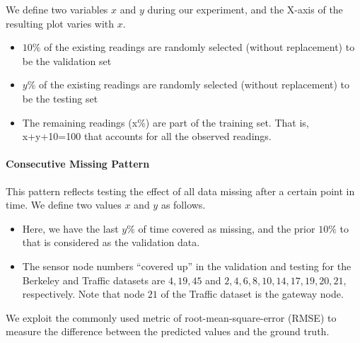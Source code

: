 We define two variables $x$ and $y$ during our experiment, and the X-axis of the resulting plot varies with $x$.

\begin{itemize}
\item $10\%$ of the existing readings are randomly selected (without replacement) to be the validation set
\item $y\%$ of the existing readings are randomly selected (without replacement) to be the testing set
\item The remaining readings (x\%) are part of the training set. That is, x+y+10=100 that accounts for all the observed readings.
\end{itemize}
\paragraph*{Consecutive Missing Pattern}

This pattern reflects testing the effect of all data missing after a certain point in time.
We define two values $x$ and $y$ as follows.

\begin{itemize}
\item Here, we have the last $y\%$ of time covered as missing, and the prior $10\%$ to that is considered as the validation data.
\item The sensor node numbers ``covered up'' in the validation and testing for the Berkeley and Traffic datasets are ${4,19,45}$ and ${2,4,6,8,10,14,17,19,20,21}$, respectively.
Note that node $21$ of the Traffic dataset is the gateway node.
\end{itemize}

We exploit the commonly used metric of root-mean-square-error (RMSE) to measure the difference between the predicted values and the ground truth.
